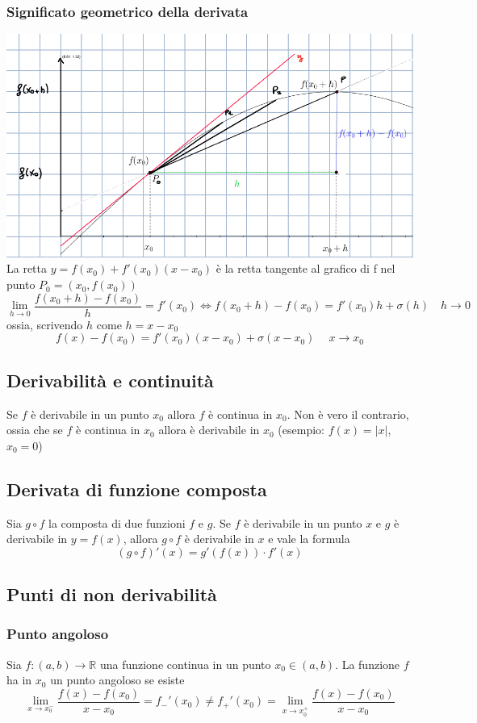 \documentclass[12pt]{article}
\begin{document}
\subsubsection{Significato geometrico della derivata}
\includegraphics[width=\textwidth]{images/deriv.png}
La retta $y=f(x_0) + f'(x_0)(x-x_0)$ è la retta
tangente al grafico di f nel punto $P_0 = (x_0, f(x_0))$
\[  \lim_{h \to 0} \frac{f(x_0 + h) - f(x_0)}{h} = f'(x_0)
\Leftrightarrow
f(x_0 + h) - f(x_0) = f'(x_0)h + \sigma(h) \quad h \to 0\]
ossia, scrivendo $h$ come $h = x - x_0$
\[ f(x) - f(x_0) = f'(x_0)(x-x_0) + \sigma(x-x_0) \quad  \ x \to x_0\]

\subsection{Derivabilità e continuità}
Se $f$ è derivabile in un punto $x_0$
allora $f$ è continua in $x_0$. Non è vero il contrario,
ossia che se $f$ è continua in $x_0$ allora è
derivabile in $x_0$ (esempio: $f(x) = |x|$, $x_0 = 0$)

\subsection{Derivata di funzione composta}
Sia $g \circ f$ la composta di due funzioni $f$ e $g$. Se $f$ è derivabile in un punto $x$ e $g$ è derivabile in $y=f(x)$, allora $g \circ f$ è derivabile in $x$ e vale la formula
\[(g \circ f)'(x) = g'(f(x)) \cdot f'(x)\]

\subsection{Punti di non derivabilità}

\subsubsection{Punto angoloso}
Sia $f: (a,b) \to \mathbb{R}$ una funzione continua in un punto $x_0 \in (a,b)$. La funzione $f$ ha in $x_0$ un punto angoloso se esiste
\[ \lim_{x \to x_{0}^{-}} \frac{f(x) - f(x_0)}{x - x_0} = f_{-}'(x_0) \neq f_{+}'(x_0) = 
\lim_{x \to x_{0}^{+}} \frac{f(x) - f(x_0)}{x - x_0}\]
\end{document}

